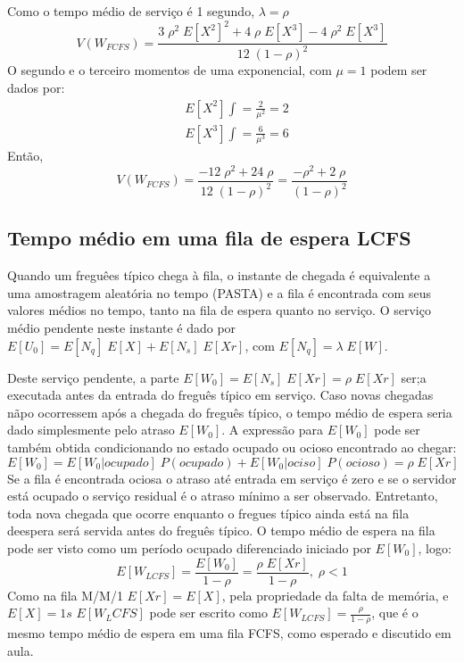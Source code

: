 \documentclass[a4paper]{article}
\newcommand{\E}[1]{E\!\left[#1\right]}
\begin{document}
Como o tempo médio de serviço é 1 segundo, \(\lambda = \rho\)
\[
    V(W_{FCFS}) = \frac{3 \; \rho^2 \; \E{X^2}^2
        + 4 \; \rho \; \E{X^3} - 4 \; \rho^2 \; \E{X^3}}{12
        \; (1 - \rho)^2}
\]
O segundo e o terceiro momentos de uma exponencial,
com \(\mu = 1\) podem ser dados por:
\begin{align*}
    &\E{X^2} \int = \frac{2}{\mu^2 } = 2 \\
    &\E{X^3} \int = \frac{6}{\mu^3 } = 6
\end{align*}
Então,
\[
    V(W_{FCFS})
    = \frac{-12 \; \rho^2 + 24 \; \rho}{12 \; (1 - \rho)^2} = \frac{-\rho^2 + 2 \; \rho}{(1 - \rho)^2}
\]
\subsection{Tempo médio em uma fila de espera LCFS}
Quando um freguêes típico chega à fila, o instante de chegada
é equivalente a uma amostragem aleatória no tempo (PASTA)
e a fila  é encontrada com seus valores médios no tempo,
tanto na fila de espera quanto no serviço.
O serviço médio pendente neste instante  é dado
por \(\E{U_0} = \E{N_q}\;\E{X} + \E{N_s}\;\E{Xr}\), com \(\E{N_q} = \lambda\;\E{W}\).

Deste serviço pendente, a parte \(\E{W_0} = \E{N_s}\;\E{Xr} = \rho\;\E{Xr}\)
ser;a executada antes da entrada do freguês típico em serviço.
Caso novas chegadas nãpo ocorressem após a chegada
do freguês típico, o tempo médio de espera seria dado simplesmente
pelo atraso \(\E{W_0}\). A expressão para \(\E{W_0}\) pode ser também
obtida condicionando no estado ocupado ou ocioso
encontrado ao chegar:
\[
    \E{W_0} = \E{W_0|ocupado} \; P(ocupado) + \E{W_0|ociso} \; P(ocioso) = \rho\;\E{Xr}
\]
Se a fila  é encontrada ociosa o atraso até entrada em serviço  é zero e se o servidor
está ocupado o serviço residual  é o atraso mínimo a ser observado.
Entretanto, toda nova chegada que ocorre enquanto o fregues típico
ainda está na fila deespera será servida antes do freguês típico.
O tempo médio de espera na fila pode ser visto
como um período ocupado diferenciado iniciado por \(\E{W_0}\), logo:
\[
    \E{W_{LCFS}} = \frac{ \E{W_0}}{ 1-\rho} = \frac{ \rho\;\E{Xr}}{ 1-\rho},\;\rho < 1
\]
Como na fila M/M/1 \(\E{Xr} = \E{X}\), pela propriedade da falta de memória, e  \(\E{X} =1s\)
\(\E{W_LCFS}\) pode ser escrito como \(\E{W_{LCFS}} =  \frac{ \rho}{ 1-\rho}\), que
é o mesmo tempo médio de espera em uma fila FCFS, como esperado e discutido em aula.
\end{document}
